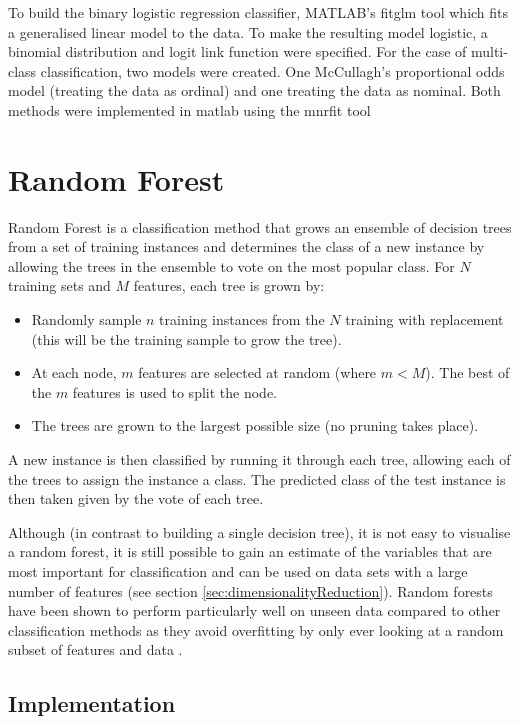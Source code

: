 To build the binary logistic regression classifier, MATLAB's fitglm tool which fits a generalised linear model to the data. To make the resulting model logistic, a binomial distribution and logit link function were specified. For the case of multi-class classification, two models were created. One McCullagh's proportional odds model (treating the data as ordinal) and one treating the data as nominal. Both methods were implemented in matlab using the mnrfit tool

\section{Random Forest}

Random Forest is a classification method that grows an ensemble of decision trees from a set of training instances and determines the class of a new instance by allowing the trees in the ensemble to vote on the most popular class. For $N$ training sets and $M$ features, each tree is grown by:

\begin{itemize}
\item Randomly sample $n$ training instances from the $N$ training with replacement (this will be the training sample to grow the tree).
\item At each node, $m$ features are selected at random (where $m < M$). The best of the $m$ features is used to split the node.
\item The trees are grown to the largest possible size (no pruning takes place).
\end{itemize}

A new instance is then classified by running it through each tree, allowing each of the trees to assign the instance a class. The predicted class of the test instance is then taken given by the vote of each tree.

Although (in contrast to building a single decision tree), it is not easy to visualise a random forest, it is still possible to gain an estimate of the variables that are most important for classification and can be used on data sets with a large number of features (see section \ref{sec:dimensionalityReduction}). Random forests have been shown to perform particularly well on unseen data compared to other classification methods as they avoid overfitting by only ever looking at a random subset of features and data \cite{Breiman}. 

\subsection{Implementation}

